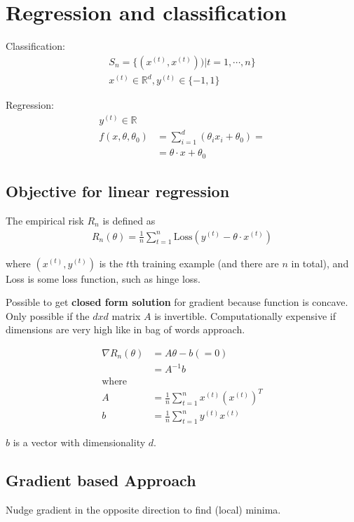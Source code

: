 \section{Regression and classification}

Classification:
\begin{align*}
S_n = \{(x^{(t)},x^{(t)}))|t=1,\cdots,n\}\\
x^{(t)} \in \mathbb{R}^d, y^{(t)} \in \{-1,1\}
\end{align*}

Regression:
\begin{align*}
y^{(t)} \in \mathbb{R}\\
f(x,\theta,\theta_0) &= \sum_{i=1}^d (\theta_i x_i + \theta_0) = \\
&=\theta \cdot x + \theta_0
\end{align*}

\subsection{Objective for linear regression}

The empirical risk  $R_n$  is defined as
\begin{align*}
R_ n(\theta ) = \frac{1}{n} \sum _{t=1}^{n} \text {Loss}(y^{(t)} - \theta \cdot x^{(t)})
\end{align*}

where  $(x^{(t)},y^{(t)})$  is the  $t$th training example (and there are $n$ in total), and  Loss  is some loss function, such as hinge loss.

Possible to get \textbf{closed form solution} for gradient because function is concave. Only possible if the $dxd$ matrix $A$ is invertible. Computationally expensive if dimensions are very high like in bag of words approach.

\begin{align*}
\nabla R_ n(\theta ) &= A\theta - b (=0)\\
&= A^{-1}b\\
\text {where } \\
A &= \frac{1}{n} \sum _{t=1}^{n} x^{(t)} ( x^{(t)})^ T\\
b &= \frac{1}{n} \sum _{t=1}^{n} y^{(t)} x^{(t)}
\end{align*}

$b$ is a vector with dimensionality $d$.
\subsection{Gradient based Approach}
Nudge gradient in the opposite direction to find (local) minima.

